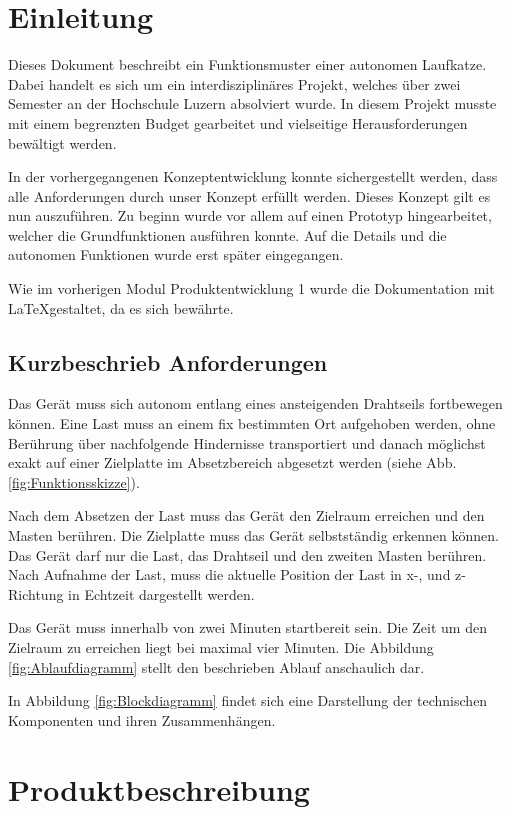 \documentclass[a4paper]{report}
\begin{document}
\chapter{Einleitung}
\label{ch:Intro}
Dieses Dokument beschreibt ein Funktionsmuster einer autonomen Laufkatze. Dabei handelt es sich um ein interdisziplinäres Projekt, welches über zwei Semester an der Hochschule Luzern absolviert wurde. In diesem Projekt musste mit einem begrenzten Budget gearbeitet und vielseitige Herausforderungen bewältigt werden.

In der vorhergegangenen Konzeptentwicklung konnte sichergestellt werden, dass alle Anforderungen durch unser Konzept erfüllt werden. Dieses Konzept gilt es nun auszuführen. Zu beginn wurde vor allem auf einen Prototyp hingearbeitet, welcher die Grundfunktionen ausführen konnte. Auf die Details und die autonomen Funktionen wurde erst später eingegangen. 

Wie im vorherigen Modul Produktentwicklung 1 wurde die Dokumentation mit \LaTeX gestaltet, da es sich bewährte.

\section{Kurzbeschrieb Anforderungen}
\label{sec:KurzAnforder}
Das Gerät muss sich autonom entlang eines ansteigenden Drahtseils fortbewegen können. Eine Last muss an einem fix bestimmten Ort aufgehoben werden, ohne Berührung über nachfolgende Hindernisse transportiert und danach möglichst exakt auf einer Zielplatte im Absetzbereich abgesetzt werden (siehe Abb.\ref{fig:Funktionsskizze}).

Nach dem Absetzen der Last muss das Gerät den Zielraum erreichen und den Masten berühren. Die Zielplatte muss das Gerät selbstständig erkennen können. Das Gerät darf nur die Last, das Drahtseil und den zweiten Masten berühren. Nach Aufnahme der Last, muss die aktuelle Position der Last in x-, und z-Richtung in Echtzeit dargestellt werden.

Das Gerät muss innerhalb von zwei Minuten startbereit sein. Die Zeit um den Zielraum zu erreichen liegt bei maximal vier Minuten. Die Abbildung \ref{fig:Ablaufdiagramm} stellt den beschrieben Ablauf anschaulich dar.

In Abbildung \ref{fig:Blockdiagramm} findet sich eine Darstellung der technischen Komponenten und ihren Zusammenhängen.

\chapter{Produktbeschreibung}
\label{ch:Produktbeschreibung}
\end{document}
